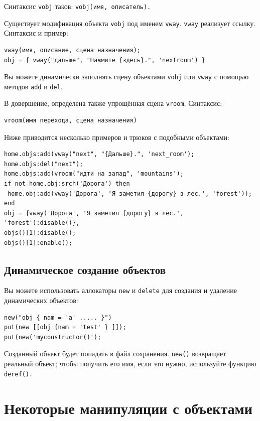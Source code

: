 \documentclass[a4paper,12pt]{article}
\begin{document}
Синтаксис \verb/vobj/ таков: \verb/vobj(имя, описатель)./

Существует модификация объекта \verb/vobj/ под именем \verb/vway/. \verb/vway/ реализует ссылку. Синтаксис и пример:

\begin{verbatim}
vway(имя, описание, сцена назначения);
obj = { vway("дальше", "Нажмите {здесь}.", 'nextroom') }
\end{verbatim}

Вы можете динамически заполнять сцену объектами \verb/vobj/ или \verb/vway/ с помощью методов \verb/add/ и \verb/del/.

В довершение, определена также упрощённая сцена \verb/vroom/. Синтаксис:

\begin{verbatim}
vroom(имя перехода, сцена назначения)
\end{verbatim}

Ниже приводится несколько примеров и трюков с подобными объектами:

\begin{verbatim}
home.objs:add(vway("next", "{Дальше}.", 'next_room');
home.objs:del("next");
home.objs:add(vroom("идти на запад", 'mountains');
if not home.obj:srch('Дорога') then
 home.obj:add(vway('Дорога', 'Я заметил {дорогу} в лес.', 'forest'));
end
obj = {vway('Дорога', 'Я заметил {дорогу} в лес.', 'forest'):disable()},
objs()[1]:disable();
objs()[1]:enable();
\end{verbatim}

\subsection{Динамическое создание объектов}
Вы можете использовать аллокаторы \verb/new/ и \verb/delete/ для создания и удаление динамических объектов:

\begin{verbatim}
new("obj { nam = 'a' ..... }")
put(new [[obj {nam = 'test' } ]]);
put(new('myconstructor()');
\end{verbatim}

Созданный объект будет попадать в файл сохранения. \verb/new()/ возвращает реальный объект; чтобы получить его имя, если это нужно, используйте функцию  \verb/deref()./

\section{Некоторые манипуляции с объектами}
\end{document}
